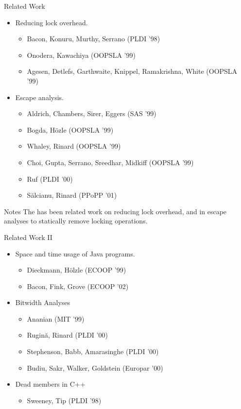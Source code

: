 \documentclass[%
pdf,
colorBG,
slideColor,
nototal,
oqe
]{prosper}
\renewcommand{\yellow}{\colC}
\newenvironment{talknotes}{\begin{slide}{Notes}\tiny}{\end{slide}}
\begin{document}
\begin{slide}{Related Work}
\begin{itemize}
\item Reducing lock overhead.
\begin{itemize} \yellow\small %
\item Bacon, Konuru, Murthy, Serrano (PLDI '98)
\item Onodera, Kawachiya (OOPSLA '99)
\item Agesen, Detlefs, Garthwaite, Knippel, Ramakrishna, White (OOPSLA '99)
\end{itemize}
\item Escape analysis.
\begin{itemize} \yellow\small %
\item Aldrich, Chambers, Sirer, Eggers (SAS '99)
\item Bogda, H\"ozle (OOPSLA '99)
\item Whaley, Rinard (OOPSLA '99)
\item Choi, Gupta, Serrano, Sreedhar, Midkiff (OOPSLA '99)
\item Ruf (PLDI '00)
\item S\u{a}lcianu, Rinard (PPoPP '01)
\end{itemize}
\end{itemize}
\end{slide}

\begin{talknotes}
The has been related work on reducing lock overhead, and in escape
analyses to statically remove locking operations.
\end{talknotes}

\begin{slide}{Related Work II}
\begin{itemize}
\item Space and time usage of Java programs.
\begin{itemize} \yellow\small%
\item Dieckmann, H\"olzle (ECOOP '99)
\item Bacon, Fink, Grove (ECOOP '02)
\end{itemize}
\item Bitwidth Analyses
\begin{itemize} \yellow\small%
\item Ananian (MIT '99)
\item Rugin\u{a}, Rinard (PLDI '00)
\item Stephenson, Babb, Amarasinghe (PLDI '00)
\item Budiu, Sakr, Walker, Goldstein (Europar '00)
\end{itemize}
\item Dead members in C++
\begin{itemize} \yellow\small%
\item Sweeney, Tip (PLDI '98)
\end{itemize}
\end{itemize}
\end{slide}
\end{document}
